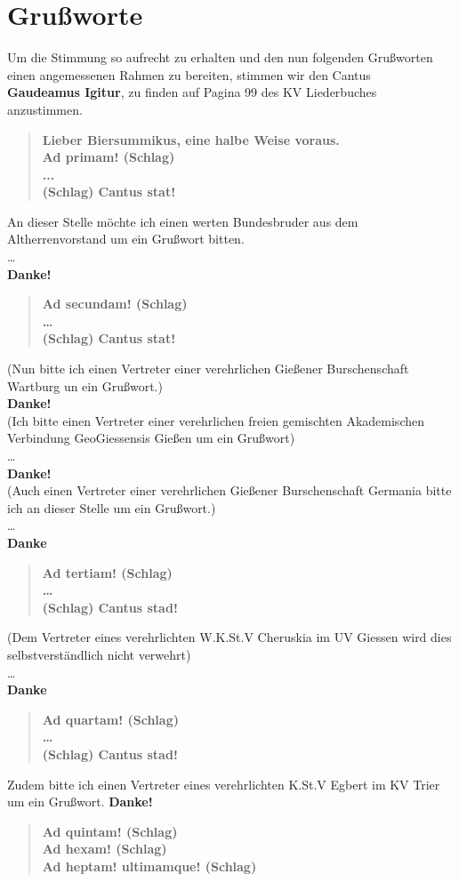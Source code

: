 \section{Grußworte}

Um die Stimmung so aufrecht zu erhalten und den nun folgenden
Grußworten einen angemessenen Rahmen zu bereiten, stimmen wir
den Cantus\\
\textbf{Gaudeamus Igitur}, zu finden auf Pagina 99 des KV Liederbuches
anzustimmen.
\begin{quote}
    \textbf{
        Lieber Biersummikus, eine halbe Weise voraus.\\
        Ad primam! (Schlag)\\
        ...\\
        (Schlag) Cantus stat!
        }
\end{quote}
An dieser Stelle möchte ich einen werten Bundesbruder aus dem
Altherrenvorstand um ein Grußwort bitten.\\
\dots\\
\textbf{Danke!}
\begin{quote}
    \textbf{
        Ad secundam! (Schlag)\\
        \dots\\
        (Schlag) Cantus stat!
        }
\end{quote}
(Nun bitte ich einen Vertreter einer verehrlichen Gießener Burschenschaft Wartburg un ein
 Grußwort.) \\
\textbf{Danke!}\\
(Ich bitte einen Vertreter einer verehrlichen freien gemischten Akademischen
Verbindung GeoGiessensis Gießen um ein Grußwort)\\
\dots\\
\textbf{Danke!}\\
(Auch einen Vertreter einer verehrlichen Gießener Burschenschaft Germania bitte
ich an dieser Stelle um ein Grußwort.)\\
\dots\\
\textbf{Danke}\\
\begin{quote}
    \textbf{
        Ad tertiam! (Schlag)\\
        \dots\\
        (Schlag) Cantus stad!
        }
\end{quote}
(Dem Vertreter eines verehrlichten W.K.St.V Cheruskia im UV Giessen
wird dies selbstverständlich nicht verwehrt)\\
\dots\\
\textbf{Danke}\\
\begin{quote}
    \textbf{
        Ad quartam! (Schlag)\\
        \dots\\
        (Schlag) Cantus stad!
        }
\end{quote}
Zudem bitte ich einen Vertreter eines verehrlichten K.St.V
Egbert im KV Trier um ein Grußwort.
\textbf{Danke!}
\begin{quote}
    \textbf{
        Ad quintam! (Schlag)\\
        Ad hexam! (Schlag)\\
        Ad heptam! ultimamque! (Schlag)
        }
\end{quote}